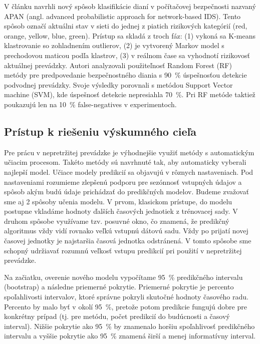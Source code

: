 \documentclass[thesismargins, thesislinespacing, openright, upjsfrontpage, combineabstracts]{rnthesis}
\begin{document}
V článku \cite{shin2013advanced} navrhli nový spôsob klasifikácie dianí v počítačovej bezpečnosti nazvaný APAN (angl. advanced probabilistic approach for network-based IDS). Tento spôsob označí aktuálni stav v sieti do jednej z piatich rizikových kategórií ({red, orange, yellow, blue, green}). Prístup sa skladá z troch fáz: (1) vykoná sa K-means klastrovanie so zohladnením outlierov, (2) je vytvorený Markov model s prechodovou maticou podľa klastrov, (3) v reálnom čase sa vyhodnotí rizikovosť aktuálnej prevádzky. Autori \cite{liu2015cloudy} analyzovali použiteľnosť Random Forest (RF) metódy pre predpovedanie bezpečnostného diania s 90~\% úspešnosťou detekcie podvodnej prevádzky. Svoje výsledky porovnali s metódou Support Vector machine (SVM), kde úspešnosť detekcie nepresiahla 70~\%. Pri RF metóde taktiež poukazujú len na 10~\% false-negatives v experimentoch.

\subsection{Prístup k riešeniu výskumného cieľa}\label{c2_metodologia}

Pre prácu v nepretržitej prevádzke je výhodnejšie využiť metódy s automatickým učiacim procesom. Takéto metódy sú navrhnuté tak, aby automaticky vyberali najlepší model. Učiace modely predikcií sa objavujú v rôznych nastaveniach. Pod nastaveniami rozumieme zlepšenú podporu pre sezónnosť vstupných údajov a spôsob akým budú údaje prichádzať do predikčných modelov. Budeme zvažovať sme aj 2 spôsoby učenia modelu. V prvom, klasickom prístupe, do modelu postupne vkladáme hodnoty ďalších časových jednotiek z trénovacej sady. V druhom spôsobe využívame tzv. posuvné okno, čo znamená, že predikčný algoritmus vždy vidí rovnako veľkú vstupnú dátovú sadu. Vždy po prijatí novej časovej jednotky je najstaršia časová jednotka odstránená. V tomto spôsobe sme schopný udržiavať rozumnú veľkosť vstupu predikcií pri použití v nepretržitej prevádzke.

Na začiatku, overenie nového modelu vypočítame 95~\% predikčného intervalu (bootstrap) a následne priemerné pokrytie. Priemerné pokrytie je percento spoľahlivosti intervalov, ktoré správne pokryli skutočné hodnoty časového radu. Percento by malo byť v okolí 95~\%, pretože potom predikcie fungujú dobre pre konkrétny prípad (tj. pre metódu, počet predikcií do budúcnosti a časový interval). Nižšie pokrytie ako 95~\% by znamenalo horšiu spoľahlivosť predikčného intervalu a vyššie pokrytie ako 95~\% znamená širší a menej informatívny interval.
\end{document}
